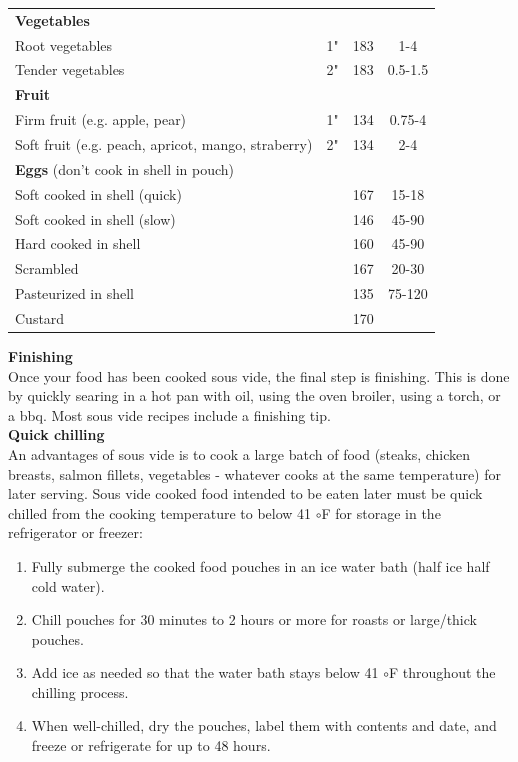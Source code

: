 \documentclass{article}
\numberwithin{figure}{section}
\numberwithin{equation}{section}
\begin{document}
\begin{table}[h]
\begin{tabular}{l c c c}
	\hline
	{\bf Vegetables} & & & \\
	Root vegetables & 1" & 183 & 1-4\\
	Tender vegetables & 2" & 183 & 0.5-1.5\\
	\hline
	{\bf Fruit} & & & \\
	Firm fruit (e.g. apple, pear) & 1" & 134 & 0.75-4\\
	Soft fruit (e.g. peach, apricot, mango, straberry) & 2" & 134 & 2-4\\
	\hline
	{\bf Eggs} (don't cook in shell in pouch) & & &\\
	Soft cooked in shell (quick) & & 167 & 15-18\\
	Soft cooked in shell (slow) & & 146 & 45-90\\
	Hard cooked in shell & & 160 & 45-90\\
	Scrambled & & 167 & 20-30\\
	Pasteurized in shell & & 135 & 75-120\\
	Custard & & 170 & \\
	\end{tabular}
	\label{table:albedo}
	\end{table}

{\bf Finishing}\\
Once your food has been cooked sous vide, the final step is finishing. This is done by quickly searing in a hot pan with oil, using the oven broiler, using a torch, or a bbq. Most sous vide recipes include a finishing tip.\\

{\bf Quick chilling}\\
An advantages of sous vide is to cook a large batch of food (steaks, chicken breasts, salmon fillets, vegetables - whatever cooks at the same temperature) for later serving. Sous vide cooked food intended to be eaten later must be quick chilled from the cooking temperature to below 41 ${\circ}$F for storage in the refrigerator or freezer:
\begin{enumerate}
\item Fully submerge the cooked food pouches in an ice water bath (half ice half cold water). 
\item Chill pouches for 30 minutes to 2 hours or more for roasts or large/thick pouches. 
\item Add ice as needed so that the water bath stays below 41 ${\circ}$F throughout the chilling process. 
\item When well-chilled, dry the pouches, label them with contents and date, and freeze or refrigerate for up to 48 hours. 
\end{enumerate}
\end{document}
